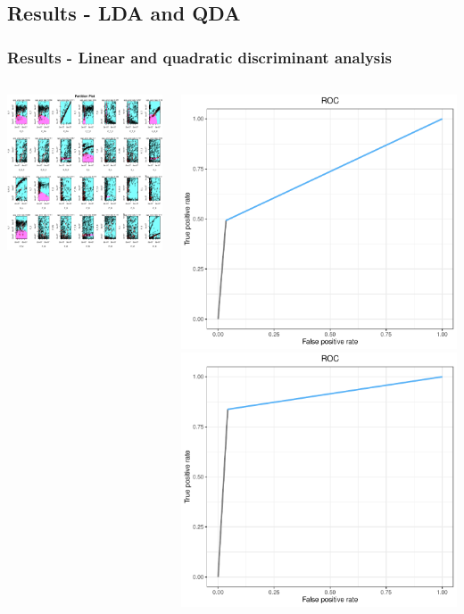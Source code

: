 \documentclass[compress]{beamer}
\begin{document}
\subsection{Results -  LDA and QDA}
\begin{frame}
\frametitle{Results - Linear and quadratic discriminant analysis}
\begin{columns}
\begin{center}
\includegraphics[width=\linewidth]{Pic/QDA_project_FULL.pdf}
\end{center}
\begin{center}
\includegraphics[width=0.5\linewidth]{Pic/LDA_FULL_ROC.pdf}
\includegraphics[width=0.5\linewidth]{Pic/QDA_FULL_ROC.pdf}\\

\end{center}
\end{columns}
\end{frame}
\end{document}
